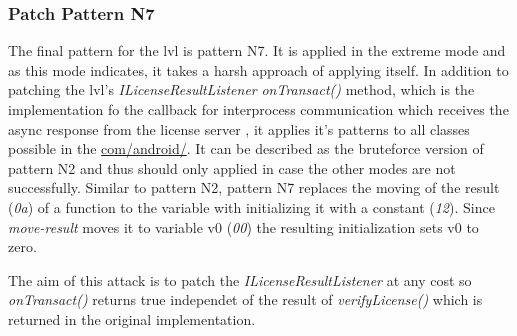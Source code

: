 \subsubsection{Patch Pattern N7}
The final pattern for the \gls{lvl} is pattern N7.
It is applied in the extreme mode and as this mode indicates, it takes a harsh approach of applying itself.
In addition to patching the \gls{lvl}'s \textit{ILicenseResultListener} \textit{onTransact()} method, which is the implementation fo the callback for interprocess communication which receives the async response from the license server \cite{developersLicensingReference}, it applies it's patterns to all classes possible in the \url{com/android/}.
It can be described as the bruteforce version of pattern N2 and thus should only applied in case the other modes are not successfully.
\newline
Similar to pattern N2, pattern N7 replaces the moving of the result (\textit{0a}) of a function to the variable with initializing it with a constant (\textit{12}).
Since \textit{move-result} moves it to variable v0 (\textit{00}) the resulting initialization sets v0 to zero.
\newline

The aim of this attack is to patch the \textit{ILicenseResultListener} at any cost so \textit{onTransact()} returns true independet of the result of \textit{verifyLicense()} which is returned in the original implementation.

